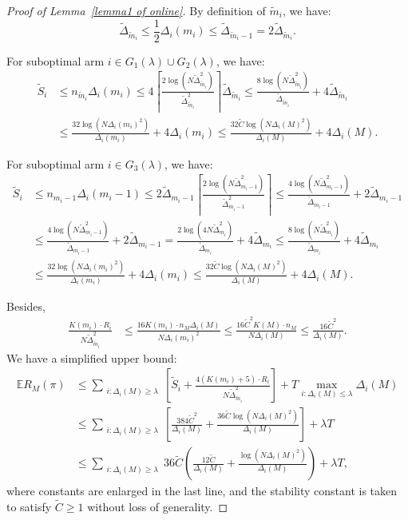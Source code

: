 \documentclass[
  12pt]{article}
\begin{document}
\begin{proof}[Proof of Lemma~\ref{lemma1 of online}]

By definition of $\tilde{m}_i$, we have:
\[  \tilde{\Delta}_{\tilde{m}_i} \leq \frac{1}{2}\Delta_i(m_i)\leq \tilde{\Delta}_{\tilde{m}_i-1}=2 \tilde{\Delta}_{\tilde{m}_i}.\]

For suboptimal arm $i\in G_1(\lambda)\cup G_2(\lambda)$, we have:
\begin{align*}
   \tilde{S}_i &\leq n_{\tilde{m}_i}\Delta_i(m_i)\leq 
4 \left\lceil \frac{2\log(N \tilde{\Delta}_{\tilde{m}_i}^2)}{\tilde{\Delta}_{\tilde{m}_i}^2} \right\rceil \tilde{\Delta}_{\tilde{m}_i} \leq \frac{8\log(N \tilde{\Delta}_{\tilde{m}_i}^2)}{\tilde{\Delta}_{\tilde{m}_i}} +4\tilde{\Delta}_{\tilde{m}_i} \\
& \le \frac{32\log(N \Delta_i(m_i)^2)}{\Delta_i(m_i)} +4\Delta_i(m_i)
\le  \frac{32 \tilde{C}\log(N \Delta_i(M)^2)}{\Delta_i(M)} +4\Delta_i(M).
\end{align*}

For suboptimal arm $i\in G_3(\lambda)$, we have:
\begin{align*}
     \tilde{S}_i &\leq n_{m_i-1}\Delta_i(m_i-1)\leq 2\tilde{\Delta}_{m_i-1} \left\lceil \frac{2\log(N \tilde{\Delta}_{m_i-1}^2)}{\tilde{\Delta}_{m_i-1}^2} \right\rceil  \leq \frac{4\log(N \tilde{\Delta}_{m_i-1}^2)}{\tilde{\Delta}_{m_i-1}}+2\tilde{\Delta}_{m_i-1} \\
     &\le \frac{4\log(N \tilde{\Delta}_{m_i-1}^2)}{\tilde{\Delta}_{m_i-1}}+2\tilde{\Delta}_{m_i-1}
     = \frac{2\log(4N \tilde{\Delta}_{m_i}^2)}{\tilde{\Delta}_{m_i}}+4\tilde{\Delta}_{m_i} 
     \le \frac{8\log(N \tilde{\Delta}_{m_i}^2)}{\tilde{\Delta}_{m_i}}+4\tilde{\Delta}_{m_i}\\ 
     &\le \frac{32\log(N \Delta_i(m_i)^2)}{\Delta_i(m_i)} +4\Delta_i(m_i)
\le  \frac{32 \tilde{C}\log(N \Delta_i(M)^2)}{\Delta_i(M)} +4\Delta_i(M).
\end{align*}

 Besides, 
\begin{align*}
    \frac{K(m_i)\cdot R_i}{N \tilde{\Delta}_{\tilde{m}_i}^2}&\leq  \frac{16K(m_i)\cdot n_M\Delta_i(M)}{N \Delta_i(m_i)^2}\leq \frac{16\tilde{C}^2K(M)\cdot n_M}{N\Delta_i(M)} \leq \frac{16\tilde{C}^2}{\Delta_i(M)}.
\end{align*}
We have a simplified upper bound:
\begin{align*}
\mathbb{E}R_M(\pi)&\leq \sum_{\substack{i: \Delta_i(M) \geq \lambda}} \left[ \tilde{S}_i+\frac{4\left(K(m_i)+5\right)\cdot R_i}{N\tilde{\Delta}_{\tilde{m}_i}^2}\right] +T\max_{i:\Delta_i(M)\leq \lambda}  \Delta_i(M)\\
&\leq
\sum_{\substack{i: \Delta_i(M) \geq \lambda}}
\left[
\frac{384\tilde{C}^2}{\Delta_i(M)}
+\frac{36\tilde{C}\log(N \Delta_i(M)^2)}{\Delta_i(M)}
\right]
+\lambda T\\
&\leq
\sum_{\substack{i: \Delta_i(M) \geq \lambda}}
36\tilde{C}
\left(
\frac{12\tilde{C}}{\Delta_i(M)}
+\frac{\log(N \Delta_i(M)^2)}{\Delta_i(M)}
\right)
+\lambda T,
\end{align*}
where constants are enlarged in the last line, and the stability constant is
taken to satisfy \(\tilde C\ge 1\) without loss of generality.
\end{proof}
\end{document}

